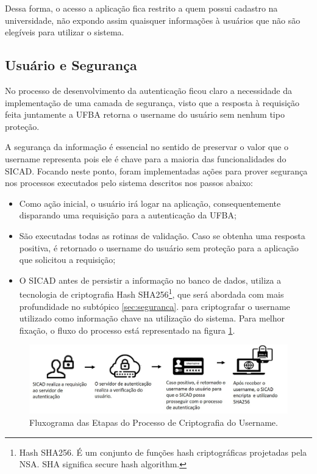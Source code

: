 \documentclass[12pt, a4paper]{report}
\begin{document}
Dessa forma, o acesso a aplicação fica restrito a quem possui cadastro na universidade, não expondo assim quaisquer informações à usuários que não são elegíveis para utilizar o sistema.

\subsection{Usuário e Segurança}
\label{subsec:userseg}
No processo de desenvolvimento da autenticação ficou claro a necessidade da implementação de uma camada de segurança, visto que a resposta à requisição feita juntamente a \ac{UFBA} retorna o username do usuário sem nenhum tipo proteção.

A segurança da informação é essencial no sentido de preservar o valor que o username representa pois ele é chave para a maioria das funcionalidades do \ac{SICAD}. Focando neste ponto, foram implementadas ações para prover segurança nos processos executados pelo sistema descritos nos passos abaixo:

\begin{itemize}
\item Como ação inicial, o usuário irá logar na aplicação, consequentemente disparando uma requisição para a autenticação da \ac{UFBA};
\item São executadas todas as rotinas de validação.
Caso se obtenha uma resposta positiva, é retornado o username do usuário sem proteção para a aplicação que solicitou a requisição;
\item O \ac{SICAD} antes de persistir a informação no banco de dados, utiliza a tecnologia de criptografia Hash SHA256\footnote{Hash SHA256. É um conjunto de funções hash criptográficas projetadas pela NSA. SHA significa secure hash algorithm.}, que será abordada com mais profundidade no subtópico \ref{sec:seguranca}. para criptografar o username utilizado como informação chave na utilização do sistema. Para melhor fixação, o fluxo do processo está representado na figura \ref{fig:fluxograma_criptografia}.
\end{itemize}

\begin{figure}
\centering
\includegraphics[scale=0.80]{fluxograma_criptografia.jpg}
\caption{Fluxograma das Etapas do Processo de Criptografia do Username.}
\label{fig:fluxograma_criptografia}
\end{figure}
\end{document}
